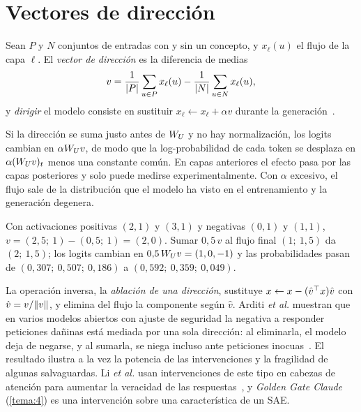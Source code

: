 \section{Vectores de dirección}

\begin{definicion}\label{def:steering}
Sean $P$ y $N$ conjuntos de entradas con y sin un concepto, y $x_\ell(u)$ el flujo de la capa $\ell$. El \emph{vector de dirección} es la diferencia de medias
\[
v=\frac{1}{\lvert P\rvert}\sum_{u\in P}x_\ell(u)-\frac{1}{\lvert N\rvert}\sum_{u\in N}x_\ell(u),
\]
y \emph{dirigir} el modelo consiste en sustituir $x_\ell\leftarrow x_\ell+\alpha v$ durante la generación~\cite{turner}.
\end{definicion}

Si la dirección se suma justo antes de $W_{U}$ y no hay normalización, los logits cambian en $\alpha W_{U} v$, de modo que la log-probabilidad de cada token se desplaza en $\alpha(W_{U} v)_t$ menos una constante común. En capas anteriores el efecto pasa por las capas posteriores y solo puede medirse experimentalmente. Con $\alpha$ excesivo, el flujo sale de la distribución que el modelo ha visto en el entrenamiento y la generación degenera.

\begin{ejemplo}\label{ej:steering}
Con activaciones positivas $(2,1)$ y $(3,1)$ y negativas $(0,1)$ y $(1,1)$, $v=(2{,}5;\allowbreak\ 1)-(0{,}5;\allowbreak\ 1)=(2,0)$. Sumar $0{,}5\,v$ al flujo final $(1;\allowbreak\ 1{,}5)$ da $(2;\allowbreak\ 1{,}5)$; los logits cambian en $0{,}5\,W_{U} v=(1,0,-1)$ y las probabilidades pasan de $(0{,}307;\allowbreak\ 0{,}507;\allowbreak\ 0{,}186)$ a $(0{,}592;\allowbreak\ 0{,}359;\allowbreak\ 0{,}049)$.
\end{ejemplo}

La operación inversa, la \emph{ablación de una dirección}, sustituye $x\leftarrow x-(\hat v^{\top} x)\hat v$ con $\hat v=v/\lVert v\rVert$, y elimina del flujo la componente según $\hat v$. Arditi \emph{et al.} muestran que en varios modelos abiertos con ajuste de seguridad la negativa a responder peticiones dañinas está mediada por una sola dirección: al eliminarla, el modelo deja de negarse, y al sumarla, se niega incluso ante peticiones inocuas~\cite{arditi}. El resultado ilustra a la vez la potencia de las intervenciones y la fragilidad de algunas salvaguardas. Li \emph{et al.} usan intervenciones de este tipo en cabezas de atención para aumentar la veracidad de las respuestas~\cite{li-iti}, y \emph{Golden Gate Claude} (\cref{tema:4}) es una intervención sobre una característica de un SAE.

